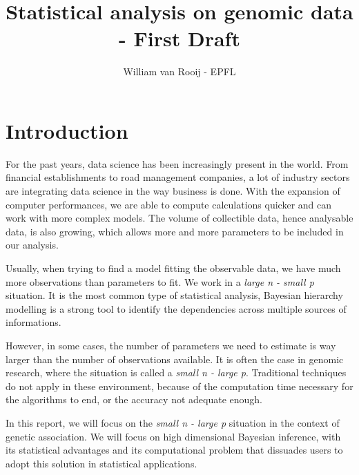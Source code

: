 \documentclass{article}
\numberwithin{equation}{section}
\begin{document}
\title{Statistical analysis on genomic data - First Draft}
\author{William van Rooij - EPFL}

\maketitle

\newpage
\tableofcontents
\newpage
\section{Introduction}
For the past years, data science has been increasingly present in the world. From financial establishments to road management companies, a lot of industry sectors are integrating data science in the way business is done. With the expansion of computer performances, we are able to compute calculations quicker and can work with more complex models. The volume of collectible data, hence analysable data, is also growing, which allows more and more parameters to be included in our analysis.

Usually, when trying to find a model fitting the observable data, we have much more observations than parameters to fit. We work in a \textit{large n - small p} situation. It is the most common type of statistical analysis, Bayesian hierarchy modelling is a strong tool to identify the dependencies across multiple sources of informations.

However, in some cases, the number of parameters we need to estimate is way larger than the number of observations available. It is often the case in genomic research, where the situation is called a \textit{small n - large p}. Traditional techniques do not apply in these environment, because of the computation time necessary for the algorithms to end, or the accuracy not adequate enough.

In this report, we will focus on the \textit{small n - large p} situation in the context of genetic association. We will focus on high dimensional Bayesian inference, with its statistical advantages and its computational problem that dissuades users to adopt this solution in statistical applications.
\end{document}
